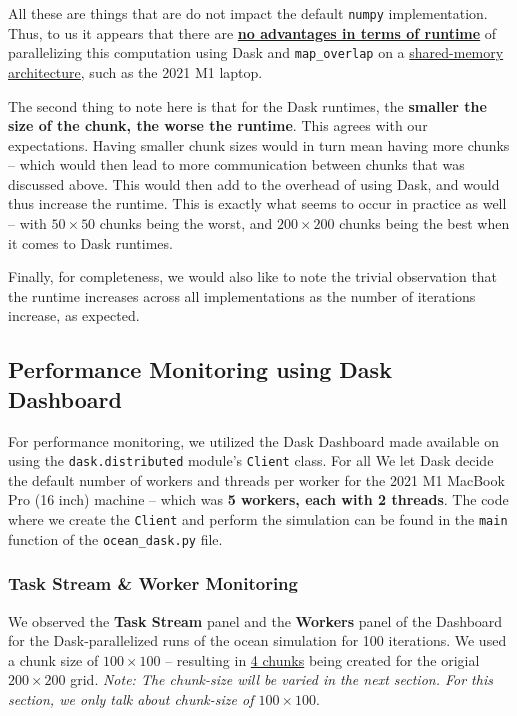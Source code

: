 \documentclass[a4paper,12pt]{article}
\begin{document}
All these are things that are do not impact the default \verb|numpy| implementation. Thus, to us it appears that there are \textbf{\underline{no advantages in terms of runtime}} of parallelizing this computation using Dask and \verb|map_overlap| on a \underline{shared-memory architecture}, such as the 2021 M1 laptop. 

The second thing to note here is that for the Dask runtimes, the \textbf{smaller the size of the chunk, the worse the runtime}. This agrees with our expectations. Having smaller chunk sizes would in turn mean having more chunks -- which would then lead to more communication between chunks that was discussed above. This would then add to the overhead of using Dask, and would thus increase the runtime. This is exactly what seems to occur in practice as well -- with $50 \times 50$ chunks being the worst, and $200 \times 200$ chunks being the best when it comes to Dask runtimes. 

Finally, for completeness, we would also like to note the trivial observation that the runtime increases across all implementations as the number of iterations increase, as expected. 

\subsection{Performance Monitoring using Dask Dashboard}
For performance monitoring, we utilized the Dask Dashboard made available on using the \verb|dask.distributed| module's \verb|Client| class. For all We let Dask decide the default number of workers and threads per worker for the 2021 M1 MacBook Pro (16 inch) machine -- which was \textbf{5 workers, each with 2 threads}. The code where we create the \verb|Client| and perform the simulation can be found in the \verb|main| function of the \verb|ocean_dask.py| file.

\subsubsection{Task Stream \& Worker Monitoring}
We observed the \textbf{Task Stream} panel and the \textbf{Workers} panel of the Dashboard for the Dask-parallelized runs of the ocean simulation for 100 iterations. We used a chunk size of $100 \times 100$ -- resulting in \underline{4 chunks} being created for the origial $200 \times 200$ grid. \textit{Note: The chunk-size will be varied in the next section. For this section, we only talk about chunk-size of $100 \times 100$}. 
\end{document}
